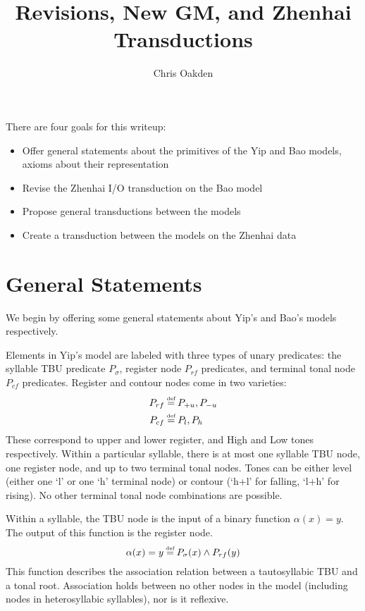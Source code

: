 \documentclass{article}
\title{Revisions, New GM, and Zhenhai Transductions}
\author{Chris Oakden}
\newcommand\myeq{\mathrel{\stackrel{\makebox[0pt]{\mbox{\normalfont\tiny def}}}{=}}}
\begin{document}
\maketitle
There are four goals for this writeup:
\begin{itemize}
	\item Offer general statements about the primitives of the Yip and Bao models, axioms about their representation
	\item Revise the Zhenhai I/O transduction on the Bao model
	\item Propose general transductions between the models
	\item Create a transduction between the models on the Zhenhai data
\end{itemize}
\section{General Statements}
We begin by offering some general statements about Yip's and Bao's models respectively.\par
Elements in Yip's model are labeled with three types of unary predicates: the syllable TBU predicate $P_{\sigma}$, register node $P_{rf}$ predicates, and terminal tonal node $P_{cf}$ predicates. Register and contour nodes come in two varieties:
\begin{equation} \label{registerandcontour}
\begin{aligned}
P_{rf}&\myeq P_{+u}, P_{-u} \\
P_{cf}&\myeq P_{l}, P_{h}
\end{aligned}
\end{equation}
 These correspond to upper and lower register, and High and Low tones respectively. Within a particular syllable, there is at most one syllable TBU node, one register node, and up to two terminal tonal nodes. Tones can be either level (either one `l' or one `h' terminal node) or contour (`h+l' for falling, `l+h' for rising). No other terminal tonal node combinations are possible. \par
Within a syllable, the TBU node is the input of a binary function $\alpha(x)=y$. The output of this function is the register node.
\begin{equation}
\alpha(x)=y\myeq P_{\sigma}(x)\land P_{rf}(y)
\end{equation}
This function describes the association relation between a tautosyllabic TBU and a tonal root. Association holds between no other nodes in the model (including nodes in heterosyllabic syllables), nor is it reflexive. \par
\end{document}
